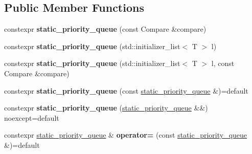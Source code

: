 \subsection*{Public Member Functions}
\begin{DoxyCompactItemize}
\item 
\mbox{\label{classsequoia_1_1data__structures_1_1static__priority__queue_a3e409b46472abe82f18b52f5e2bfe198}} 
constexpr {\bfseries static\+\_\+priority\+\_\+queue} (const Compare \&compare)
\item 
\mbox{\label{classsequoia_1_1data__structures_1_1static__priority__queue_ae5cf96254cd2da5b2838560711e1bc33}} 
constexpr {\bfseries static\+\_\+priority\+\_\+queue} (std\+::initializer\+\_\+list$<$ T $>$ l)
\item 
\mbox{\label{classsequoia_1_1data__structures_1_1static__priority__queue_ae9680867bee5d95974d988ea82c03a40}} 
constexpr {\bfseries static\+\_\+priority\+\_\+queue} (std\+::initializer\+\_\+list$<$ T $>$ l, const Compare \&compare)
\item 
\mbox{\label{classsequoia_1_1data__structures_1_1static__priority__queue_adfe3fb55ab348f7c988569f8f8fdbe29}} 
constexpr {\bfseries static\+\_\+priority\+\_\+queue} (const \mbox{\hyperlink{classsequoia_1_1data__structures_1_1static__priority__queue}{static\+\_\+priority\+\_\+queue}} \&)=default
\item 
\mbox{\label{classsequoia_1_1data__structures_1_1static__priority__queue_a084ed23a373c38ff123572156240b380}} 
constexpr {\bfseries static\+\_\+priority\+\_\+queue} (\mbox{\hyperlink{classsequoia_1_1data__structures_1_1static__priority__queue}{static\+\_\+priority\+\_\+queue}} \&\&) noexcept=default
\item 
\mbox{\label{classsequoia_1_1data__structures_1_1static__priority__queue_a7bad0a8994cde57191b0ef78d72755e1}} 
constexpr \mbox{\hyperlink{classsequoia_1_1data__structures_1_1static__priority__queue}{static\+\_\+priority\+\_\+queue}} \& {\bfseries operator=} (const \mbox{\hyperlink{classsequoia_1_1data__structures_1_1static__priority__queue}{static\+\_\+priority\+\_\+queue}} \&)=default

\end{DoxyCompactItemize}
